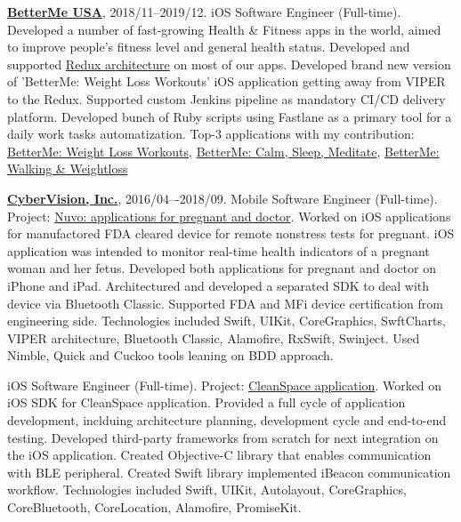 \documentclass{nk-resume}
\begin{document}
\textbf{\href{https://betterme.world/about}{BetterMe USA}}, 2018/11--2019/12. 
iOS Software Engineer (Full-time).
\newline Developed a number of fast-growing Health \& Fitness apps in the world, 
aimed to improve people’s fitness level and general health status. Developed and supported 
\href{https://www.raywenderlich.com/books/advanced-ios-app-architecture/v3.0/chapters/6-architecture-redux}{Redux architecture} 
on most of our apps. Developed brand new version of 'BetterMe: Weight Loss Workouts' iOS application 
getting away from VIPER to the Redux. Supported custom Jenkins pipeline as mandatory CI/CD delivery platform. 
Developed bunch of Ruby scripts using Fastlane as a primary tool for a daily work tasks automatization.
\newline Top-3 applications with my contribution: 
\href{https://apps.apple.com/us/app/betterme-weight-loss-workouts/id1264546236}{BetterMe: Weight Loss Workouts}, 
\href{https://apps.apple.com/us/app/betterme-calm-sleep-meditate/id1363010081}{BetterMe: Calm, Sleep, Meditate}, 
\href{https://apps.apple.com/us/app/betterme-walking-weightloss/id1434400695}{BetterMe: Walking \& Weightloss}

\vspace*{14px}

\textbf{\href{https://www.cybervisiontech.com}{CyberVision, Inc.}}, 2016/04–-2018/09.
\newline Mobile Software Engineer (Full-time). Project: \href{https://www.nuvocares.com/solutions}{Nuvo: applications for pregnant and doctor}.
\newline Worked on iOS applications for manufactored FDA cleared device for remote nonstress tests for pregnant. 
iOS application was intended to monitor real-time health indicators of a pregnant woman and her fetus. 
Developed both applications for pregnant and doctor on iPhone and iPad.
Architectured and developed a separated SDK to deal with device via Bluetooth Classic.
Supported FDA and MFi device certification from engineering side.
\newline Technologies included Swift, UIKit, CoreGraphics, SwftCharts, VIPER architecture, 
Bluetooth Classic, Alamofire, RxSwift, Swinject. Used Nimble, Quick and Cuckoo tools leaning on BDD approach.

\vspace*{7px}

iOS Software Engineer (Full-time). Project: \href{https://www.sensynehealth.com/cleanspace}{CleanSpace application}.
\newline Worked on iOS SDK for CleanSpace application. 
Provided a full cycle of application development, inclduing architecture planning, 
development cycle and end-to-end testing.
Developed third-party frameworks from scratch for next integration on the iOS application.
Created Objective-C library that enables communication with BLE peripheral.
Created Swift library implemented iBeacon communication workflow. 
\newline Technologies included Swift, UIKit, Autolayout, CoreGraphics, CoreBluetooth, CoreLocation, Alamofire, PromiseKit.
\end{document}
